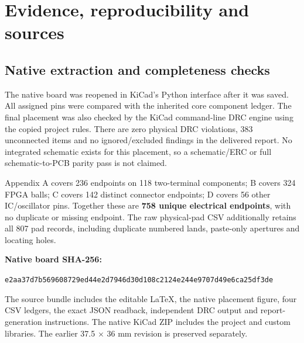 \documentclass[11pt,a4paper]{article}
\begin{document}
\clearpage\section{Evidence, reproducibility and sources}
\subsection{Native extraction and completeness checks}
The native board was reopened in KiCad's Python interface after it was saved. All assigned pins were compared with the inherited core component ledger. The final placement was also checked by the KiCad command-line DRC engine using the copied project rules. There are zero physical DRC violations, 383 unconnected items and no ignored/excluded findings in the delivered report. No integrated schematic exists for this placement, so a schematic/ERC or full schematic-to-PCB parity pass is not claimed.

Appendix A covers 236 endpoints on 118 two-terminal components; B covers 324 FPGA balls; C covers 142 distinct connector endpoints; D covers 56 other IC/oscillator pins. Together these are \textbf{758 unique electrical endpoints}, with no duplicate or missing endpoint. The raw physical-pad CSV additionally retains all 807 pad records, including duplicate numbered lands, paste-only apertures and locating holes.

\textbf{Native board SHA-256:}\par
\nolinkurl{e2aa37d7b569608729ed44e2d7946d30d108c2124e244e9707d49e6ca25df3de}

The source bundle includes the editable LaTeX, the native placement figure, four CSV ledgers, the exact JSON readback, independent DRC output and report-generation instructions. The native KiCad ZIP includes the project and custom libraries. The earlier 37.5 $\times$ 36 mm revision is preserved separately.
\end{document}
